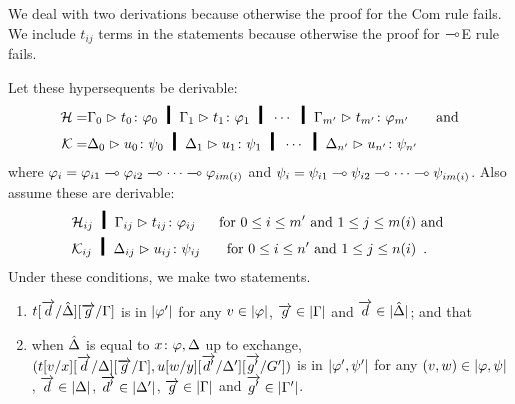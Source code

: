 
We deal with two derivations because otherwise the proof for the
Com rule fails.
We include $t_{ij}$ terms in the statements because otherwise
the proof for $\multimap$E rule fails.

\begin{proposition}[Adequacy]
 Let these hypersequents be derivable:
 \begin{align*}
  \Hy = &\sequent{\G_0}{\tj{t_0}{\phi_0}} \hmid
  \sequent{\G_1}{\tj{t_1}{\phi_1}} \hmid \cdots \hmid
  \sequent{\G_{m'}}{\tj{t_{m'}}{\phi_{m'}}}
  &\text{ and}\\
  \Ky = &\sequent{\D_0}{\tj{u_0}{\psi_0}} \hmid
  \sequent{\D_1}{\tj{u_1}{\psi_1}} \hmid \cdots \hmid
  \sequent{\D_{n'}}{\tj{u_{n'}}{\psi_{n'}}}
 \end{align*}
 where $\varphi_i = {\varphi_{i1}\multimap\varphi_{i2}\multimap\cdots\multimap\varphi_{im(i)}}$
 and   $\psi_i = {\psi_{i1}\multimap\psi_{i2}\multimap\cdots\multimap\psi_{im(i)}}$.
 Also assume these are derivable:
 \begin{align*}
  & \Hy_{ij} \hmid \sequent{\G_{ij}}{\tj{t_{ij}}{\phi_{ij}}} &\text{ for
  } 0\le i\le m'\text{ and }1\le j\le m(i) &\text{ and }\\
  & \Ky_{ij} \hmid \sequent{\D_{ij}}{\tj{u_{ij}}{\psi_{ij}}} &\text{ for
  } 0\le i\le n'\text{ and }1\le j\le n(i)&\enspace .
 \end{align*}
 Under these conditions, we make two statements.
 \begin{enumerate}[label=(\arabic{*}), ref=\textit{(\arabic{*})}]
  \item \label{c:first}
	$t[\overrightarrow d/\hat{\Delta}][\overrightarrow g/\Gamma]$ is in $|{\varphi'}|$ for any
	$v\in|{\varphi}|$, $\overrightarrow g\in|{\Gamma}|$ and $\overrightarrow d\in|{\hat{\Delta}}|$; and that
  \item \label{c:second} when $\hat {\Delta}$ is equal to  ${x} \colon{\varphi}, \Delta$ up
	to exchange,
	$(t[v/x][\overrightarrow d/\Delta][\overrightarrow g/\Gamma],
	u[w/y][\overrightarrow{d'}/\Delta'][\overrightarrow{g'}/G'])$ is in $|{\varphi',\psi'}|$
	for any $(v,w)    \in |{\varphi,\psi}|$,
	        $\overrightarrow d   \in |{\Delta}|$,
	        $\overrightarrow{d'} \in |{\Delta'}|$,
	        $\overrightarrow{g}  \in |{\Gamma}|$ and
	        $\overrightarrow{g'} \in |{\Gamma'}|$.
  \end{enumerate}
 \end{proposition}
